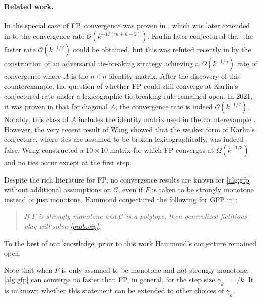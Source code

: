 \documentclass[pdflatex,sn-mathphys-num]{sn-jnl}%
\renewcommand\O{\mathcal{O}}
\newcommand\C{\mathcal{C}}
\theoremstyle{thmstyleone}%
\theoremstyle{thmstyletwo}%
\theoremstyle{thmstylethree}%
\begin{document}
\paragraph{Related work.}
In the special case of FP, convergence was proven in \cite{Robinson1951}, which was later extended in \cite{Shapiro1958} to the convergence rate $\O(k^{-1/(m+n-2)})$.
Karlin later conjectured that the faster rate $\O(k^{-1/2})$ could be obtained, but this was refuted recently in \cite{Daskalakis2014} by
the construction of an adversarial tie-breaking strategy achieving a $\Omega(k^{-1/n})$ rate of convergence where $A$ is the $n\times n$ identity matrix.
After the discovery of this counterexample, the question of whether FP could still converge at Karlin's conjectured rate under a lexicographic tie-breaking rule
remained open. In 2021, it was proven in \cite{Abernethy2021} that for diagonal $A$, the convergence rate is indeed $\O(k^{-1/2})$. Notably, this class of $A$ includes
the identity matrix used in the counterexample \cite{Daskalakis2014}. However, the very recent result of Wang \cite{Wang2025} showed that the weaker form of Karlin's conjecture,
where ties are assumed to be broken lexicographically, was indeed false. Wang constructed a $10\times 10$ matrix for which FP converges at $\Omega(k^{-1/3})$ and
no ties occur except at the first step.

Despite the rich literature for FP, no convergence results are known for \eqref{alg:gfp} without additional assumptions on $\C$, even if $F$ is taken to be strongly monotone instead of just monotone.
Hammond conjectured the following for GFP in \cite[Section~4.3.1]{Hammond1984}:
\begin{quote}
  \emph{If $F$ is strongly monotone and $\C$ is a polytope, then generalized fictitious play will solve \eqref{prob:vip}.}
\end{quote}
To the best of our knowledge, prior to this work Hammond's conjecture remained open.

Note that when $F$ is only assumed to be monotone and not strongly monotone, \eqref{alg:gfp} can converge no faster than
FP, in general, for the step size $\gamma_k = 1/k$. It is unknown whether this statement can be extended to other choices of $\gamma_k$.
\end{document}
